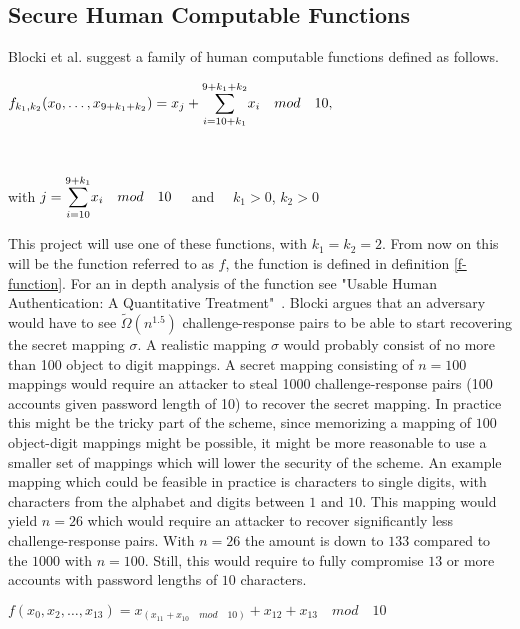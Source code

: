 \subsection{Secure Human Computable Functions}
Blocki et al. \cite{hcp-blocki} suggest a family of human computable functions defined as follows.
\centerline{ $ f_{k_1,k_2}(x_0,\dots,x_{9+k_1+k_2})= x_j + \mathlarger{\sum}\limits^{9+k_1+k_2}_{i=10+k_1} x_i \quad mod\quad 10,$}\\
\centerline{with $j = \mathlarger{\sum}\limits^{9+k_1}_{i=10} x_i \quad mod \quad 10\quad$ and $\quad k_1>0$, $k_2>0$ }
\vspace{2mm}
\par This project will use one of these functions, with $k_1=k_2=2$. From now on this will be the function referred to as $f$, the function is defined in definition \ref{f-function}. For an in depth analysis of the function see "Usable Human Authentication: A Quantitative Treatment"~\cite{Blocki2014}. Blocki argues that an adversary would have to see $\tilde \Omega(n^{1.5})$ challenge-response pairs to be able to start recovering the secret mapping $\sigma$. A realistic mapping $\sigma$ would probably consist of no more than 100 object to digit mappings. A secret mapping consisting of $n=100$ mappings would require an attacker to steal 1000 challenge-response pairs (100 accounts given password length of 10) to recover the secret mapping. In practice this might be the tricky part of the scheme, since memorizing a mapping of $100$ object-digit mappings might be possible, it might be more reasonable to use a smaller set of mappings which will lower the security of the scheme. An example mapping which could be feasible in practice is characters to single digits, with characters from the alphabet and digits between $1$ and $10$. This mapping would yield $n=26$ which would require an attacker to recover significantly less challenge-response pairs. With $n=26$ the amount is down to $133$ compared to the $1000$ with $n=100$. Still, this would require to fully compromise $13$ or more accounts with password lengths of $10$ characters.


\begin{definition}
    \label{f-function}
    $f(x_0,x_2,\dots,x_{13}) = x_{(x_{11} + x_{10}\quad mod \quad 10)} + x_{12} + x_{13}\quad mod \quad 10$ 
\end{definition}

